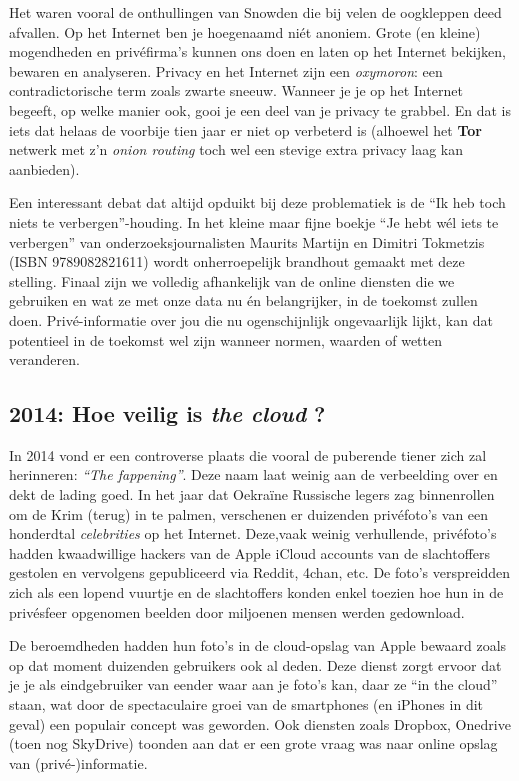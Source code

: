 \documentclass[
  10pt,
  dutch,
  paper=a4,
  ,captions=tableheading
]{scrbook}
\begin{document}
Het waren vooral de onthullingen van Snowden die bij velen de oogkleppen
deed afvallen. Op het Internet ben je hoegenaamd niét anoniem. Grote (en
kleine) mogendheden en privéfirma's kunnen ons doen en laten op het
Internet bekijken, bewaren en analyseren. Privacy en het Internet zijn
een \emph{oxymoron}: een contradictorische term zoals zwarte sneeuw.
Wanneer je je op het Internet begeeft, op welke manier ook, gooi je een
deel van je privacy te grabbel. En dat is iets dat helaas de voorbije
tien jaar er niet op verbeterd is (alhoewel het \textbf{Tor} netwerk met
z'n \emph{onion routing} toch wel een stevige extra privacy laag kan
aanbieden).

\begin{tipblock}
Een interessant debat dat altijd opduikt bij deze problematiek is de
``Ik heb toch niets te verbergen''-houding. In het kleine maar fijne
boekje ``Je hebt wél iets te verbergen'' van onderzoeksjournalisten
Maurits Martijn en Dimitri Tokmetzis (ISBN 9789082821611) wordt
onherroepelijk brandhout gemaakt met deze stelling. Finaal zijn we
volledig afhankelijk van de online diensten die we gebruiken en wat ze
met onze data nu én belangrijker, in de toekomst zullen doen.
Privé-informatie over jou die nu ogenschijnlijk ongevaarlijk lijkt, kan
dat potentieel in de toekomst wel zijn wanneer normen, waarden of wetten
veranderen.
\end{tipblock}

\subsection{\texorpdfstring{2014: Hoe veilig is \emph{the cloud}
?}{2014: Hoe veilig is the cloud ?}}\label{hoe-veilig-is-the-cloud}

In 2014 vond er een controverse plaats die vooral de puberende tiener
zich zal herinneren: \emph{``The fappening''}. Deze naam laat weinig aan
de verbeelding over en dekt de lading goed. In het jaar dat Oekraïne
Russische legers zag binnenrollen om de Krim (terug) in te palmen,
verschenen er duizenden privéfoto's van een honderdtal
\emph{celebrities} op het Internet. Deze,vaak weinig verhullende,
privéfoto's hadden kwaadwillige hackers van de Apple iCloud accounts van
de slachtoffers gestolen en vervolgens gepubliceerd via Reddit, 4chan,
etc. De foto's verspreidden zich als een lopend vuurtje en de
slachtoffers konden enkel toezien hoe hun in de privésfeer opgenomen
beelden door miljoenen mensen werden gedownload.

De beroemdheden hadden hun foto's in de cloud-opslag van Apple bewaard
zoals op dat moment duizenden gebruikers ook al deden. Deze dienst zorgt
ervoor dat je je als eindgebruiker van eender waar aan je foto's kan,
daar ze ``in the cloud'' staan, wat door de spectaculaire groei van de
smartphones (en iPhones in dit geval) een populair concept was geworden.
Ook diensten zoals Dropbox, Onedrive (toen nog SkyDrive) toonden aan dat
er een grote vraag was naar online opslag van (privé-)informatie.
\end{document}
